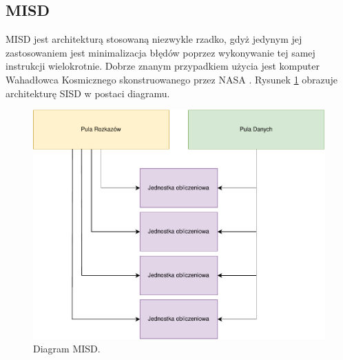 \documentclass[a4paper,12pt]{book} %
\begin{document}
\subsection {MISD}
MISD jest architekturą stosowaną niezwykle rzadko, gdyż jedynym jej zastosowaniem jest minimalizacja błędów poprzez wykonywanie tej samej instrukcji wielokrotnie. Dobrze znanym przypadkiem użycia jest komputer Wahadłowca Kosmicznego skonstruowanego przez NASA \cite{SpaceShuttle}. Rysunek \ref{fig:misd} obrazuje architekturę SISD w postaci diagramu.
\begin{figure}
	\centering
	\includegraphics[scale=1]{assets/MISD.pdf}
	\caption{Diagram MISD.}
	\label{fig:misd}
\end{figure}
\end{document}
